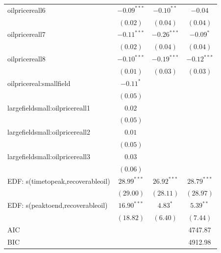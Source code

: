 \documentclass[11pt]{article}
\begin{document}
\begin{spacing}{1}
\begin{table}
\begin{center}
\begin{tabular}{l c c c }
oilpricereall6                    & $-0.09^{***}$   & $-0.10^{**}$   & $-0.04$         \\
                                     & $(0.02)$        & $(0.04)$       & $(0.04)$        \\
oilpricereall7                    & $-0.11^{***}$   & $-0.26^{***}$  & $-0.09^{*}$     \\
                                     & $(0.02)$        & $(0.04)$       & $(0.04)$        \\
oilpricereall8                    & $-0.10^{***}$   & $-0.19^{***}$  & $-0.12^{***}$   \\
                                     & $(0.01)$        & $(0.03)$       & $(0.03)$        \\
oilpricereal:smallfield      & $-0.11^{*}$     &                &                 \\
                                     & $(0.05)$        &                &                 \\
largefieldsmall:oilpricereall1   & $0.02$          &                &                 \\
                                     & $(0.05)$        &                &                 \\
largefieldsmall:oilpricereall2   & $0.01$          &                &                 \\
                                     & $(0.05)$        &                &                 \\
largefieldsmall:oilpricereall3   & $0.03$          &                &                 \\
                                     & $(0.06)$        &                &                 \\
EDF: s(timetopeak,recoverableoil) & $28.99^{***}$   & $26.92^{***}$  & $28.79^{***}$   \\
                                     & $(29.00)$       & $(28.11)$      & $(28.97)$       \\
EDF: s(peaktoend,recoverableoil)  & $16.90^{***}$   & $4.83^{*}$     & $5.39^{**}$     \\
                                     & $(18.82)$       & $(6.40)$       & $(7.44)$        \\
\hline
AIC                                  &                 &                & 4747.87         \\
BIC                                  &                 &                & 4912.98         \\

\end{tabular}
\end{center}
\end{table}
\end{spacing}
\end{document}
